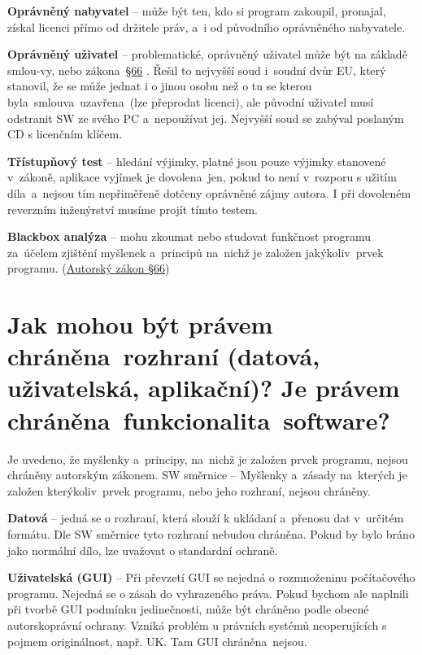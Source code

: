 \textbf{Oprávněný nabyvatel} -- může být ten, kdo si program zakoupil, pronajal, získal licenci přímo od držitele práv, a~i od původního oprávněného nabyvatele.

\textbf{Oprávněný uživatel} -- problematické, oprávněný uživatel může být na základě smlou-vy, nebo zákona~\href{https://www.zakonyprolidi.cz/cs/2000-121#p66-6}{§66} . Řešil to nejvyšší soud i~soudní dvůr EU, který stanovil, že se může jednat i o jinou osobu než o tu se kterou byla~smlouva~uzavřena~(lze přeprodat licenci), ale původní uživatel musí odstranit SW ze svého PC a~nepoužívat jej. Nejvyšší soud se zabýval poslaným CD s licenčním klíčem.

\textbf{Třístupňový test} -- hledání výjimky, platné jsou pouze výjimky stanovené v~zákoně, aplikace vyjímek je dovolena~jen, pokud to není v~rozporu s užitím díla~a~nejsou tím nepřiměřeně dotčeny oprávněné zájmy autora. I při dovoleném reverzním inženýrství musíme projít tímto testem.

\textbf{Blackbox analýza} -- mohu zkoumat nebo studovat funkčnost programu za~účelem zjištění myšlenek a~principů na~nichž je založen jakýkoliv~prvek programu. (\href{https://www.zakonyprolidi.cz/cs/2000-121#p66}{Autorský zákon §66})


\section{Jak mohou být právem chráněna~rozhraní (datová, uživatelská, aplikační)? Je právem chráněna~funkcionalita~software?}

Je uvedeno, že myšlenky a~principy, na~nichž je založen prvek programu, nejsou chráněny autorským zákonem. SW směrnice -- Myšlenky a~zásady na~kterých je založen kterýkoliv~prvek programu, nebo jeho rozhraní, nejsou chráněny. 

\textbf{Datová} -- jedná se o rozhraní, která slouží k ukládaní a~přenosu dat v~určitém formátu. Dle SW směrnice tyto rozhraní nebudou chráněna. Pokud by bylo bráno jako normální dílo, lze uvažovat o standardní ochraně.

\textbf{Uživatelská (GUI)} -- Při převzetí GUI se nejedná o rozmnoženinu počítačového programu. \textrightarrow Nejedná se o zásah do vyhrazeného práva. Pokud bychom ale naplnili při tvorbě GUI podmínku jedinečnosti, může být chráněno podle obecné autorskoprávní ochrany. Vzniká problém u právních systémů neoperujících s pojmem originálnost, např. UK\@. Tam GUI chráněna~nejsou.


